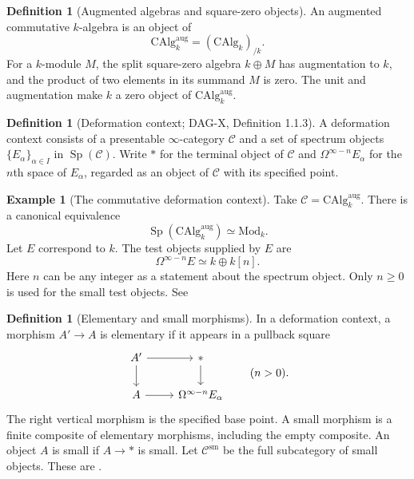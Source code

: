 \documentclass[12pt,letterpaper,oneside]{report}
\theoremstyle{definition}
\newtheorem{definition}[theorem]{Definition}
\newtheorem{example}[theorem]{Example}
\theoremstyle{remark}
\newcommand{\DAGresult}[1]{\cite[#1]{DAGX}}
\newcommand{\cC}{\mathcal C}
\newcommand{\CAlg}{\mathrm{CAlg}}
\newcommand{\Mod}{\mathrm{Mod}}
\newcommand{\aug}{\mathrm{aug}}
\newcommand{\sm}{\mathrm{sm}}
\newcommand{\Stab}{\operatorname{Sp}}
\newcommand{\term}{*}
\begin{document}
\begin{definition}[Augmented algebras and square-zero objects]
An augmented commutative $k$-algebra is an object of
\[
 \CAlg_k^{\aug}=(\CAlg_k)_{/k}.
\]
For a $k$-module $M$, the split square-zero algebra $k\oplus M$ has augmentation to $k$, and the product of two elements in its summand $M$ is zero. The unit and augmentation make $k$ a zero object of $\CAlg_k^{\aug}$.
\end{definition}


\begin{definition}[Deformation context; DAG-X, Definition 1.1.3]
A deformation context consists of a presentable $\infty$-category $\cC$ and a set of spectrum objects $\{E_\alpha\}_{\alpha\in I}$ in $\Stab(\cC)$. Write $\term$ for the terminal object of $\cC$ and $\Omega^{\infty-n}E_\alpha$ for the $n$th space of $E_\alpha$, regarded as an object of $\cC$ with its specified point.
\end{definition}

\begin{example}[The commutative deformation context]
Take $\cC=\CAlg_k^{\aug}$. There is a canonical equivalence
\[
 \Stab(\CAlg_k^{\aug})\simeq\Mod_k.
\]
Let $E$ correspond to $k$. The test objects supplied by $E$ are
\[
 \Omega^{\infty-n}E\simeq k\oplus k[n].
\]
Here $n$ can be any integer as a statement about the spectrum object. Only $n\geq0$ is used for the small test objects. See \DAGresult{Example 1.1.4} 
\end{example}

\begin{definition}[Elementary and small morphisms]
In a deformation context, a morphism $A'\to A$ is elementary if it appears in a pullback square
\[
\begin{tikzcd}
 A'\ar[r]\ar[d] & \term\ar[d] \\
 A\ar[r] & \Omega^{\infty-n}E_\alpha
\end{tikzcd}
\qquad(n>0).
\]
The right vertical morphism is the specified base point. A small morphism is a finite composite of elementary morphisms, including the empty composite. An object $A$ is small if $A\to\term$ is small. Let $\cC^{\sm}$ be the full subcategory of small objects. These are \DAGresult{Definitions 1.1.5 and 1.1.8}.
\end{definition}
\end{document}
